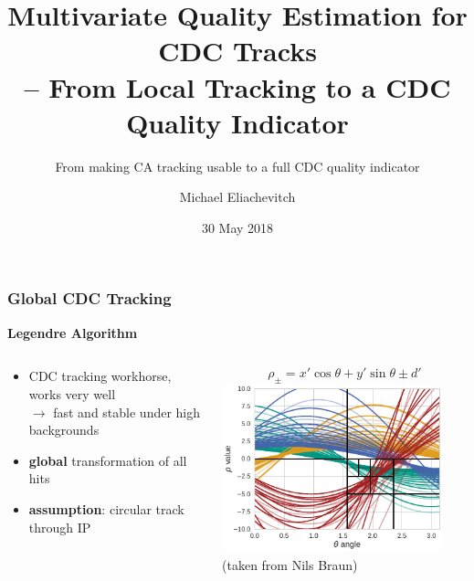 \documentclass[18pt, aspectratio=169]{beamer}
\title[Track Quality Estimation for CDC Tracking]{Multivariate Quality Estimation for CDC Tracks\\
  -- From Local Tracking to a CDC Quality Indicator}
\subtitle{From making CA tracking usable to a full CDC quality indicator}
\author{Michael Eliachevitch}
\date{30 May 2018}
\institute{ETP -- KIT}
\newcommand{\greenbold}[1]{\textcolor{kit-green100}{\bf{#1}}}
\begin{document}

\begin{frame}
  \titlepage
\end{frame}

\begin{frame}
  \frametitle{Global CDC Tracking}
  \textbf{Legendre Algorithm}
  \begin{columns}
    \begin{column}{.5\textwidth}
      \begin{itemize}
      \item CDC tracking workhorse, works very well\\
        $\rightarrow$ fast and stable under high backgrounds
      \item \greenbold{global} transformation of all hits
      \item \greenbold{assumption}: circular track through IP
      \end{itemize}
      
    \end{column}
    \begin{column}{.5\textwidth}
      \begin{equation*}
        \rho_\pm = x'\cos{\theta} + y'\sin{\theta} \pm d'
      \end{equation*}
      \includegraphics[width=0.9\textwidth]{figures/legendre_rho-theta_space.pdf}\\
      \footnotesize{(taken from Nils Braun)}
    \end{column}

  \end{columns}
\end{frame}
\end{document}

